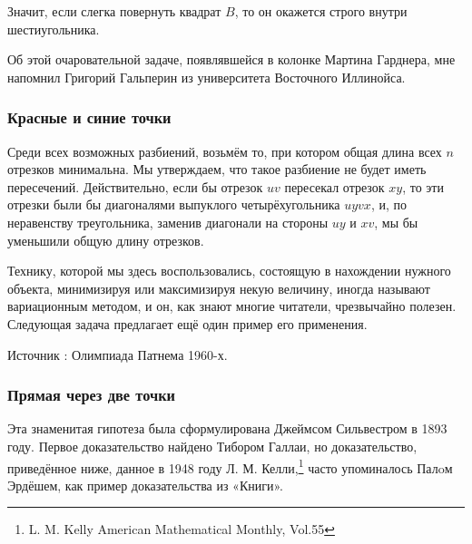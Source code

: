 Значит, если слегка повернуть квадрат $B$, то он окажется строго внутри шестиугольника.\heart

Об этой очаровательной задаче, появлявшейся в колонке Мартина Гарднера, мне напомнил Григорий Гальперин из университета Восточного Иллинойса.

\subsubsection*{Красные и синие точки}%

Среди всех возможных разбиений, возьмём то, при котором общая длина всех $n$ отрезков минимальна.
Мы утверждаем, что такое разбиение не будет иметь пересечений.
Действительно, если бы отрезок $uv$ пересекал отрезок $xy$, то эти отрезки были бы диагоналями выпуклого четырёхугольника $uyvx$, %
и, по неравенству треугольника, заменив диагонали на стороны $uy$ и $xv$, мы бы уменьшили общую длину отрезков.\heart

Технику, которой мы здесь воспользовались, состоящую в нахождении нужного объекта, минимизируя или максимизируя некую величину, иногда называют вариационным методом, и он, как знают многие читатели, чрезвычайно полезен.
Следующая задача предлагает ещё один пример его применения.

Источник : Олимпиада Патнема 1960-х.

\subsubsection*{Прямая через две точки}%

Эта знаменитая гипотеза была сформулирована Джеймсом Сильвестром в 1893 году.
Первое доказательство найдено Тибором Галлаи, %
но доказательство, приведённое ниже, данное в 1948 году Л. М. Келли,\footnote{L. M. Kelly American Mathematical Monthly, Vol.55} 
часто упоминалось Палoм Эрдёшем, как пример доказательства из «Книги».

